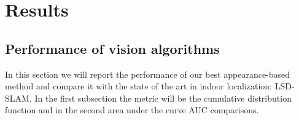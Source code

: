 \section{Results}
\label{sec:results}

\subsection{Performance of vision algorithms}
In this section we will report the performance of our best appearance-based method and compare it with the state of the art in indoor localization: LSD-SLAM. In the first subsection the metric will be the cumulative distribution function and in the second area under the curve AUC comparisons.

%
%
%	
%
%
%
